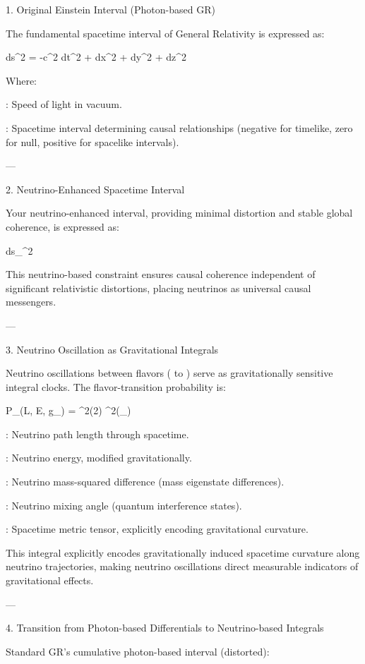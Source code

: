 

1. Original Einstein Interval (Photon-based GR)

The fundamental spacetime interval of General Relativity is expressed as:

ds^2 = -c^2 dt^2 + dx^2 + dy^2 + dz^2

Where:

: Speed of light in vacuum.

: Spacetime interval determining causal relationships (negative for timelike, zero for null, positive for spacelike intervals).



---

2. Neutrino-Enhanced Spacetime Interval

Your neutrino-enhanced interval, providing minimal distortion and stable global coherence, is expressed as:

ds_{\nu}^2 

This neutrino-based constraint ensures causal coherence independent of significant relativistic distortions, placing neutrinos as universal causal messengers.


---

3. Neutrino Oscillation as Gravitational Integrals

Neutrino oscillations between flavors ( to ) serve as gravitationally sensitive integral clocks. The flavor-transition probability is:

P_{\alpha \rightarrow \beta}(L, E, g_{\mu\nu}) = \sin^2(2\theta) \sin^2\left(\int_{}\right)

: Neutrino path length through spacetime.

: Neutrino energy, modified gravitationally.

: Neutrino mass-squared difference (mass eigenstate differences).

: Neutrino mixing angle (quantum interference states).

: Spacetime metric tensor, explicitly encoding gravitational curvature.


This integral explicitly encodes gravitationally induced spacetime curvature along neutrino trajectories, making neutrino oscillations direct measurable indicators of gravitational effects.


---

4. Transition from Photon-based Differentials to Neutrino-based Integrals

Standard GR’s cumulative photon-based interval (distorted):


